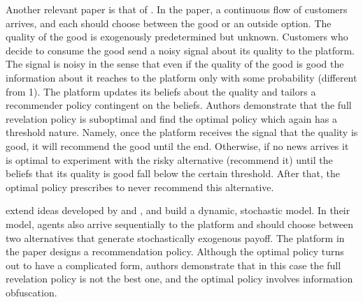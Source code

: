 \documentclass[a4paper]{article}
\begin{document}
	
	
	
	Another relevant paper is that of \cite{che2015}. In the paper, a continuous flow of customers arrives, and each should choose between the good or an outside option. The quality of the good is exogenously predetermined but unknown. Customers who decide to consume the good send a noisy signal about its quality to the platform. The signal is noisy in the sense that even if the quality of the good is good the information about it reaches to the platform only with some probability (different from 1). The platform updates its beliefs about the quality and tailors a recommender policy contingent on the beliefs. Authors demonstrate that the full revelation policy is suboptimal and find the optimal policy which again has a threshold nature. Namely, once the platform receives the signal that the quality is good, it will recommend the good until the end. Otherwise, if no news arrives it is optimal to experiment with the risky alternative (recommend it) until the beliefs that its quality is good fall below the certain threshold. After that, the optimal policy prescribes to never recommend this alternative.
	
	
	
	
	\cite{papanastasiou2017} extend ideas developed by \cite{kremer2014} and \cite{che2015}, and build a dynamic, stochastic model. In their model, agents also arrive sequentially to the platform and should choose between two alternatives that generate stochastically exogenous payoff. The platform in the paper designs a recommendation policy. Although the optimal policy turns out to have a complicated form, authors demonstrate that in this case the full revelation policy is not the best one, and the optimal policy involves information obfuscation.
	
\end{document}
